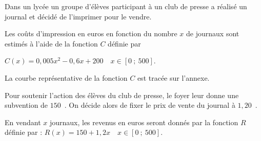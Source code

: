 \documentclass[10pt,a4paper]{article}
\newcommand{\euro}{\eurologo{}}
\begin{document}
\medskip
{\footnotesize 
Dans un lycée un groupe d’élèves participant à un club de presse a réalisé un journal et décidé de l’imprimer pour le vendre.

Les coûts d’impression en euros en fonction du nombre $x$  de journaux sont estimés à l’aide de la fonction $C$ définie par

$C(x) =  0,005x^2 - 0,6x +  200\quad  x\in [0~;~500]$.

La courbe représentative de la fonction $C$ est tracée sur l’annexe.

\medskip

Pour soutenir l’action des élèves du club de presse, le foyer leur donne une subvention de $150$~\euro. On décide alors de fixer le prix de vente du journal à $1,20$~\euro.

En vendant $x$  journaux, les revenus en euros seront donnés  par la fonction $R$ définie par :
$R(x) =  150 + 1,2x\quad  x \in [0~;~500]$.
}
\end{document}
